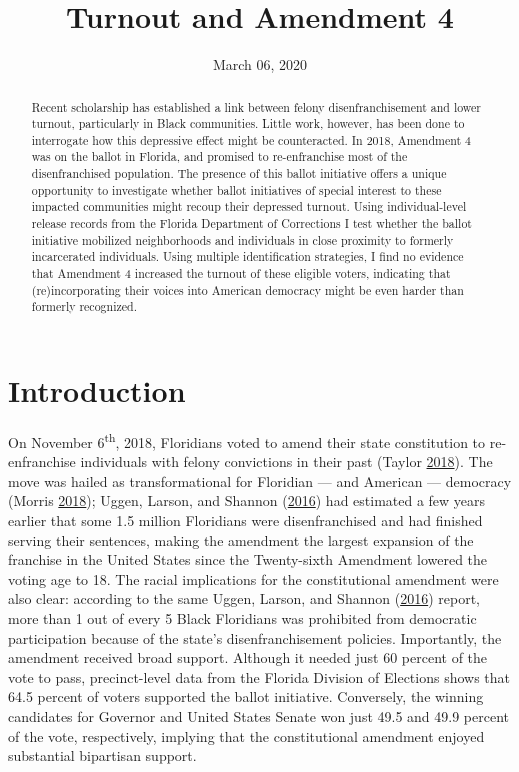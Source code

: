 \documentclass[
  12pt,
]{article}
\title{Turnout and Amendment 4}
\author{}
\date{March 06, 2020}
\begin{document}
\maketitle
\begin{abstract}
Recent scholarship has established a link between felony disenfranchisement and lower turnout, particularly in Black communities. Little work, however, has been done to interrogate how this depressive effect might be counteracted. In 2018, Amendment 4 was on the ballot in Florida, and promised to re-enfranchise most of the disenfranchised population. The presence of this ballot initiative offers a unique opportunity to investigate whether ballot initiatives of special interest to these impacted communities might recoup their depressed turnout. Using individual-level release records from the Florida Department of Corrections I test whether the ballot initiative mobilized neighborhoods and individuals in close proximity to formerly incarcerated individuals. Using multiple identification strategies, I find no evidence that Amendment 4 increased the turnout of these eligible voters, indicating that (re)incorporating their voices into American democracy might be even harder than formerly recognized.
\end{abstract}

\pagebreak

\doublespacing

\hypertarget{introduction}{%
\section*{Introduction}\label{introduction}}

On November 6\textsuperscript{th}, 2018, Floridians voted to amend their state constitution to re-enfranchise individuals with felony convictions in their past (Taylor \protect\hyperlink{ref-Taylor2018}{2018}). The move was hailed as transformational for Floridian --- and American --- democracy (Morris \protect\hyperlink{ref-Morris2018}{2018}); Uggen, Larson, and Shannon (\protect\hyperlink{ref-sentencing_2016}{2016}) had estimated a few years earlier that some 1.5 million Floridians were disenfranchised and had finished serving their sentences, making the amendment the largest expansion of the franchise in the United States since the Twenty-sixth Amendment lowered the voting age to 18. The racial implications for the constitutional amendment were also clear: according to the same Uggen, Larson, and Shannon (\protect\hyperlink{ref-sentencing_2016}{2016}) report, more than 1 out of every 5 Black Floridians was prohibited from democratic participation because of the state's disenfranchisement policies. Importantly, the amendment received broad support. Although it needed just 60 percent of the vote to pass, precinct-level data from the Florida Division of Elections shows that 64.5 percent of voters supported the ballot initiative. Conversely, the winning candidates for Governor and United States Senate won just 49.5 and 49.9 percent of the vote, respectively, implying that the constitutional amendment enjoyed substantial bipartisan support.
\end{document}
